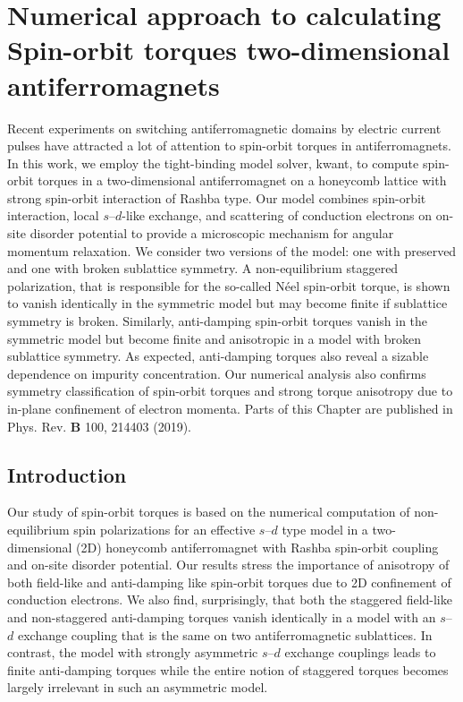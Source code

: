 \chapter{Numerical approach to calculating Spin-orbit torques two-dimensional antiferromagnets} %
\label{ch:summit}
Recent experiments on switching antiferromagnetic domains by electric current pulses have attracted a lot of attention to spin-orbit torques in antiferromagnets. In this work, we employ the tight-binding model solver, kwant,  to compute spin-orbit torques in a two-dimensional antiferromagnet on a honeycomb lattice with strong spin-orbit interaction of Rashba type. Our model combines spin-orbit interaction, local $s$--$d$-like exchange, and scattering of conduction electrons on on-site disorder potential to provide a microscopic mechanism for angular momentum relaxation. We consider two versions of the model: one with preserved and one with broken sublattice symmetry. A non-equilibrium staggered polarization, that is responsible for the so-called N\'eel spin-orbit torque, is shown to vanish identically in the symmetric model but may become finite if sublattice symmetry is broken. Similarly, anti-damping spin-orbit torques vanish in the symmetric model but become finite and anisotropic in a model with broken sublattice symmetry. As expected, anti-damping torques also reveal a sizable dependence on impurity concentration. Our numerical analysis also confirms symmetry classification of spin-orbit torques and strong torque anisotropy due to in-plane confinement of electron momenta. 
\vfill
Parts of this Chapter are published in Phys. Rev. \textbf{B} 100, 214403 (2019).
\clearpage

\section{Introduction}
Our study of spin-orbit torques is based on the numerical computation of non-equilibrium spin polarizations for an effective $s$--$d$ type model in a two-dimensional (2D) honeycomb antiferromagnet with Rashba spin-orbit coupling and on-site disorder potential.  Our results stress the importance of anisotropy of both field-like and anti-damping like spin-orbit torques due to 2D confinement of conduction electrons. We also find, surprisingly, that both the staggered field-like and non-staggered anti-damping torques vanish identically in a model with an $s$--$d$ exchange coupling that is the same on two antiferromagnetic sublattices. In contrast, the model with strongly asymmetric $s$--$d$ exchange couplings leads to finite anti-damping torques while the entire notion of staggered torques becomes largely irrelevant in such an asymmetric  model. 

